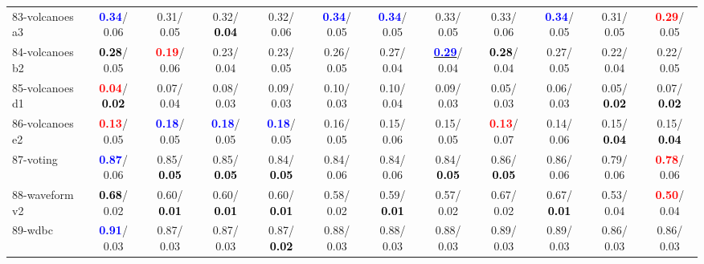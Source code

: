 \begin{table}[h]
\begin{center}
{\begin{tabular}{lc|c|c|c|c|c|c|c|c|c|c}
83-volcanoes a3 & \textcolor{blue}{\textbf{  0.34}}/  0.06 &   0.31/  0.05 &   0.32/\textcolor{black}{\textbf{  0.04}} &   0.32/  0.06 & \textcolor{blue}{\textbf{  0.34}}/  0.05 & \textcolor{blue}{\textbf{  0.34}}/  0.05 &   0.33/  0.05 &   0.33/  0.06 & \textcolor{blue}{\textbf{  0.34}}/  0.05 &   0.31/  0.05 & \textcolor{red}{\textbf{  0.29}}/  0.05 \\
84-volcanoes b2 & \textcolor{black}{\textbf{  0.28}}/  0.05 & \textcolor{red}{\textbf{  0.19}}/  0.06 &   0.23/  0.04 &   0.23/  0.05 &   0.26/  0.05 &   0.27/  0.04 & \underline{\textcolor{blue}{\textbf{  0.29}}}/  0.04 & \textcolor{black}{\textbf{  0.28}}/  0.04 &   0.27/  0.05 &   0.22/  0.04 &   0.22/  0.05 \\
85-volcanoes d1 & \textcolor{red}{\textbf{  0.04}}/\textcolor{black}{\textbf{  0.02}} &   0.07/  0.04 &   0.08/  0.03 &   0.09/  0.03 &   0.10/  0.03 &   0.10/  0.04 &   0.09/  0.03 &   0.05/  0.03 &   0.06/  0.03 &   0.05/\textcolor{black}{\textbf{  0.02}} &   0.07/\textcolor{black}{\textbf{  0.02}} \\ \hline
86-volcanoes e2 & \textcolor{red}{\textbf{  0.13}}/  0.05 & \textcolor{blue}{\textbf{  0.18}}/  0.05 & \textcolor{blue}{\textbf{  0.18}}/  0.05 & \textcolor{blue}{\textbf{  0.18}}/  0.05 &   0.16/  0.05 &   0.15/  0.06 &   0.15/  0.05 & \textcolor{red}{\textbf{  0.13}}/  0.07 &   0.14/  0.06 &   0.15/\textcolor{black}{\textbf{  0.04}} &   0.15/\textcolor{black}{\textbf{  0.04}} \\
87-voting & \textcolor{blue}{\textbf{  0.87}}/  0.06 &   0.85/\textcolor{black}{\textbf{  0.05}} &   0.85/\textcolor{black}{\textbf{  0.05}} &   0.84/\textcolor{black}{\textbf{  0.05}} &   0.84/  0.06 &   0.84/  0.06 &   0.84/\textcolor{black}{\textbf{  0.05}} &   0.86/\textcolor{black}{\textbf{  0.05}} &   0.86/  0.06 &   0.79/  0.06 & \textcolor{red}{\textbf{  0.78}}/  0.06 \\
88-waveform v2 & \textcolor{black}{\textbf{  0.68}}/  0.02 &   0.60/\textcolor{black}{\textbf{  0.01}} &   0.60/\textcolor{black}{\textbf{  0.01}} &   0.60/\textcolor{black}{\textbf{  0.01}} &   0.58/  0.02 &   0.59/\textcolor{black}{\textbf{  0.01}} &   0.57/  0.02 &   0.67/  0.02 &   0.67/\textcolor{black}{\textbf{  0.01}} &   0.53/  0.04 & \textcolor{red}{\textbf{  0.50}}/  0.04 \\
89-wdbc & \textcolor{blue}{\textbf{  0.91}}/  0.03 &   0.87/  0.03 &   0.87/  0.03 &   0.87/\textcolor{black}{\textbf{  0.02}} &   0.88/  0.03 &   0.88/  0.03 &   0.88/  0.03 &   0.89/  0.03 &   0.89/  0.03 &   0.86/  0.03 &   0.86/  0.03 \\

\end{tabular}}
\end{center}
\end{table}
